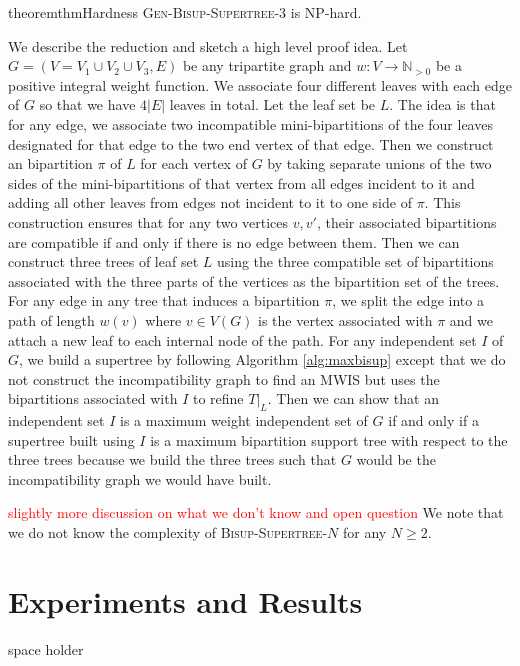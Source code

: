 \documentclass{bmcart}
\newcommand{\note}[1]{\textcolor{red}{#1}}
\newcommand{\bisupn}{\textsc{Bisup-Supertree-$N$}\xspace}
\newcommand{\genbisupthree}{\textsc{Gen-Bisup-Supertree-$3$}\xspace}
\theoremstyle{mystyle}
\theoremstyle{proofstyle}
\begin{document}
\begin{restatable}{theorem}{thmHardness}\label{thm:hardness}
\genbisupthree is NP-hard.
\end{restatable}
We describe the reduction and sketch a high level proof idea. Let $G = (V=V_1 \cup V_2 \cup V_3, E)$ be any tripartite graph and $w:V \to \mathbb{N}_{>0}$ be a positive integral weight function. We associate four different leaves with each edge of $G$ so that we have $4|E|$ leaves in total. Let the leaf set be $L$. The idea is that for any edge, we associate two incompatible mini-bipartitions of the four leaves designated for that edge to the two end vertex of that edge. Then we construct an bipartition $\pi$ of $L$ for each vertex of $G$ by taking separate unions of the two sides of the mini-bipartitions of that vertex from all edges incident to it and adding all other leaves from edges not incident to it to one side of $\pi$. This construction ensures that for any two vertices $v,v'$, their associated bipartitions are compatible if and only if there is no edge between them. Then we can construct three trees of leaf set $L$ using the three compatible set of bipartitions associated with the three parts of the vertices as the bipartition set of the trees. For any edge in any tree that induces a bipartition $\pi$, we split the edge into a path of length $w(v)$ where $v \in V(G)$ is the vertex associated with $\pi$ and we attach a new leaf to each internal node of the path. For any independent set $I$ of $G$, we build a supertree by following Algorithm \ref{alg:maxbisup} except that we do not construct the incompatibility graph to find an MWIS but uses the bipartitions associated with $I$ to refine $T|_L$. Then we can show that an independent set $I$ is a maximum weight independent set of $G$ if and only if a supertree built using $I$ is a maximum bipartition support tree with respect to the three trees because we build the three trees such that $G$ would be the incompatibility graph we would have built. \smallskip

\note{slightly more discussion on what we don't know and open question}
We note that we do not know the complexity of \bisupn for any $N \ge 2$. 


\section{Experiments and Results}
\newpage
space holder
\newpage
\end{document}
